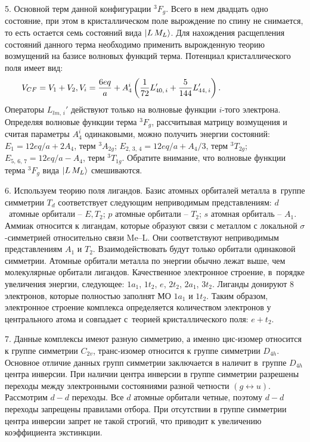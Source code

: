 5. Основной терм данной конфигурации $^3F_g$. Всего в нем двадцать одно состояние, при этом в кристаллическом поле вырождение по спину не снимается, то есть остается семь состояний вида $\ket{L\,M_L}$. Для нахождения расщепления состояний данного терма необходимо применить вырожденную теорию возмущений на базисе волновых функций терма. Потенциал кристаллического поля имеет вид:
\begin{equation*}
\begin{aligned}
& V_{CF}= V_{1}+V_{2}, V_i = \dfrac{6eq}{a} + A_{4}^i \left( \dfrac{1}{72}L_{40,\,i}' +\dfrac{5}{144}L_{44,\,i}'  \right). \hspace{25mm}
\end{aligned}
\end{equation*}
Операторы $L_{lm,\,i}'$ действуют только на волновые функции $i$-того электрона. Определяя волновые функции терма $^3F_g$, рассчитывая матрицу возмущения и считая параметры $A_{4}^i$ одинаковыми, можно получить энергии состояний: $E_{1}=12eq/a+2A_4$, терм $^3A_{2g}$; $E_{2,\,3,\,4}=12eq/a+A_4/3$, терм $^3T_{2g}$; $E_{5,\,6,\,7}=12eq/a-A_4$, терм $^3T_{1g}$. Обратите внимание, что волновые функции терма $^3F_g$ вида $\ket{L\,M_L}$ смешиваются.\par
6. Используем теорию поля лигандов. Базис атомных орбиталей металла в~группе симметрии $T_d$ соответствует следующим неприводимым представлениям: $d$~атомные орбитали – $E, T_2$; $p$ атомные орбитали – $T_2$; $s$ атомная орбиталь – $A_1$. Аммиак относится к лигандам, которые образуют связи с металлом с локальной $\sigma$-симметрией относительно связи Me–L. Они соответствуют неприводимым представлениям $A_1$ и $T_2$. Взаимодействовать будут только орбитали одинаковой симметрии. Атомные орбитали металла по энергии обычно лежат выше, чем молекулярные орбитали лигандов. Качественное электронное строение, в~порядке увеличения энергии, следующее: $1a_1$, $1t_2$, $e$, $2t_2$, $2a_1$, $3t_2$. Лиганды донируют 8 электронов, которые полностью заполнят МО $1a_1$ и $1t_2$. Таким образом, электронное строение комплекса определяется количеством электронов у центрального атома и совпадает с~теорией кристаллического поля: $e+t_2$.\par
7. Данные комплексы имеют разную симметрию, а именно цис-изомер относится к группе симметрии $C_{2v}$, транс-изомер относится к группе симметрии $D_{4h}$. Основное отличие данных групп симметрии заключается в наличит в~группе $D_{4h}$ центра инверсии. При наличии центра инверсии в группе симметрии разрешены переходы между электронными состояниями разной четности $(g \leftrightarrow u)$. Рассмотрим $d-d$ переходы. Все $d$ атомные орбитали четные, поэтому $d-d$ переходы запрещены правилами отбора. При отсутствии в группе симметрии центра инверсии запрет не такой строгий, что приводит к увеличению коэффициента экстинкции.\par
